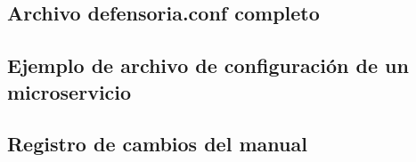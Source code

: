 \subsection{Archivo defensoria.conf completo}

\subsection{Ejemplo de archivo de configuración de un microservicio}

\subsection{Registro de cambios del manual}
